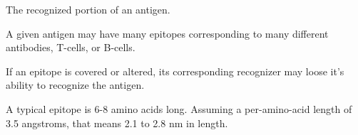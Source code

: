 The recognized portion of an antigen.

A given antigen may have many epitopes corresponding to many different antibodies, T-cells, or B-cells.  

If an epitope is covered or altered, its corresponding recognizer may loose it's ability to recognize the antigen.

A typical epitope is 6-8 amino acids long.  Assuming a per-amino-acid length of 3.5 angstroms, that means 2.1 to 2.8 nm in length.